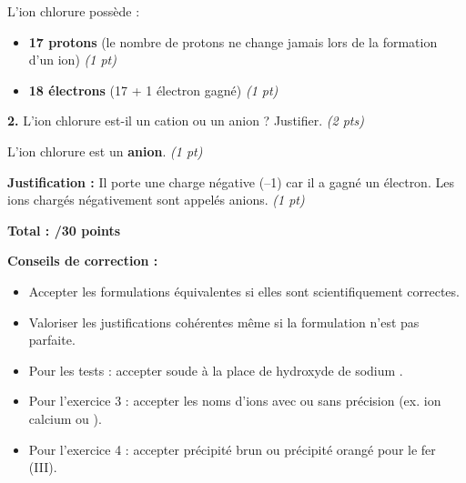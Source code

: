 \documentclass[11pt,a4paper]{article}
\begin{document}
	\begin{tcolorbox}[colback=green!5!white,colframe=green!75!black]
		L'ion chlorure  possède :
		\begin{itemize}
			\item \textbf{17 protons} (le nombre de protons ne change jamais lors de la formation d'un ion) \textit{(1 pt)}
			\item \textbf{18 électrons} (17 + 1 électron gagné) \textit{(1 pt)}
		\end{itemize}
	\end{tcolorbox}
	
	\vspace{3mm}
	
	\textbf{2.} L'ion chlorure est-il un cation ou un anion ? Justifier. \hfill \textit{(2 pts)}
	
	\begin{tcolorbox}[colback=green!5!white,colframe=green!75!black]
		L'ion chlorure  est un \textbf{anion}. \textit{(1 pt)}
		
		\textbf{Justification :} Il porte une charge négative (--1) car il a gagné un électron. Les ions chargés négativement sont appelés anions. \textit{(1 pt)}
	\end{tcolorbox}
	
	\vspace{10mm}
	
	\begin{center}
		\LARGE{\textbf{Total : /30 points}}
	\end{center}
	
	\vspace{5mm}
	
	\begin{tcolorbox}[colback=red!5!white,colframe=red!75!black]
		\textbf{Conseils de correction :}
		\begin{itemize}
			\item Accepter les formulations équivalentes si elles sont scientifiquement correctes.
			\item Valoriser les justifications cohérentes même si la formulation n'est pas parfaite.
			\item Pour les tests : accepter \og soude \fg{} à la place de \og hydroxyde de sodium \fg{}.
			\item Pour l'exercice 3 : accepter les noms d'ions avec ou sans précision (ex. ion calcium ou ).
			\item Pour l'exercice 4 : accepter \og précipité brun \fg{} ou \og précipité orangé \fg{} pour le fer (III).
		\end{itemize}
	\end{tcolorbox}
	
\end{document}
